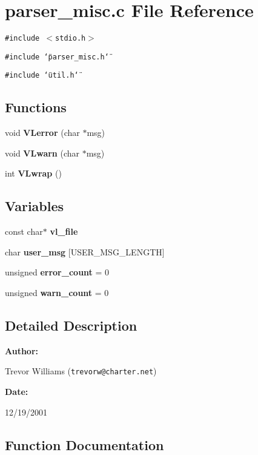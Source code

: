 \section{parser\_\-misc.c File Reference}
\label{parser__misc_8c}
{\tt \#include $<$stdio.h$>$}\par
{\tt \#include \char`\"{}parser\_\-misc.h\char`\"{}}\par
{\tt \#include \char`\"{}util.h\char`\"{}}\par
\subsection*{Functions}
\begin{CompactItemize}
\item 
void {\bf VLerror} (char $\ast$msg)
\item 
void {\bf VLwarn} (char $\ast$msg)
\item 
int {\bf VLwrap} ()
\end{CompactItemize}
\subsection*{Variables}
\begin{CompactItemize}
\item 
const char$\ast$ {\bf vl\_\-file}
\item 
char {\bf user\_\-msg} [USER\_\-MSG\_\-LENGTH]
\item 
unsigned {\bf error\_\-count} = 0
\item 
unsigned {\bf warn\_\-count} = 0
\end{CompactItemize}


\subsection{Detailed Description}


\begin{Desc}
\item[{\bf Author: }]\par
Trevor Williams ({\tt trevorw@charter.net}) \end{Desc}
\begin{Desc}
\item[{\bf Date: }]\par
12/19/2001

\end{Desc}


\subsection{Function Documentation}
